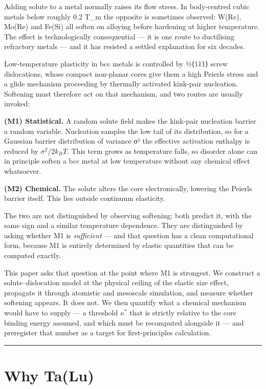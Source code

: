 Adding solute to a metal normally raises its flow stress. In body-centred cubic metals below roughly 0.2 T\_m the opposite is sometimes observed: W(Re), Mo(Re) and Fe(Si) all soften on alloying before hardening at higher temperature. The effect is technologically consequential --- it is one route to ductilising refractory metals --- and it has resisted a settled explanation for six decades.

Low-temperature plasticity in bcc metals is controlled by ½⟨111⟩ screw dislocations, whose compact non-planar cores give them a high Peierls stress and a glide mechanism proceeding by thermally activated kink-pair nucleation. Softening must therefore act on that mechanism, and two routes are usually invoked:

\textbf{(M1) Statistical.} A random solute field makes the kink-pair nucleation barrier a random variable. Nucleation samples the low tail of its distribution, so for a Gaussian barrier distribution of variance σ² the effective activation enthalpy is reduced by \(\sigma^2/2k_BT\). This term grows as temperature falls, so disorder alone can in principle soften a bcc metal at low temperature without any chemical effect whatsoever.

\textbf{(M2) Chemical.} The solute alters the core electronically, lowering the Peierls barrier itself. This lies outside continuum elasticity.

The two are not distinguished by observing softening; both predict it, with the same sign and a similar temperature dependence. They are distinguished by asking whether M1 is \emph{sufficient} --- and that question has a clean computational form, because M1 is entirely determined by elastic quantities that can be computed exactly.

This paper asks that question at the point where M1 is strongest. We construct a solute--dislocation model at the physical ceiling of the elastic size effect, propagate it through atomistic and mesoscale simulation, and measure whether softening appears. It does not. We then quantify what a chemical mechanism would have to supply --- a threshold \(\kappa^*\) that is strictly relative to the core binding energy assumed, and which must be recomputed alongside it --- and preregister that number as a target for first-principles calculation.

\begin{center}\rule{0.5\linewidth}{0.5pt}\end{center}

\hypertarget{why-talu}{%
\section{Why Ta(Lu)}\label{sec:why-talu}}

